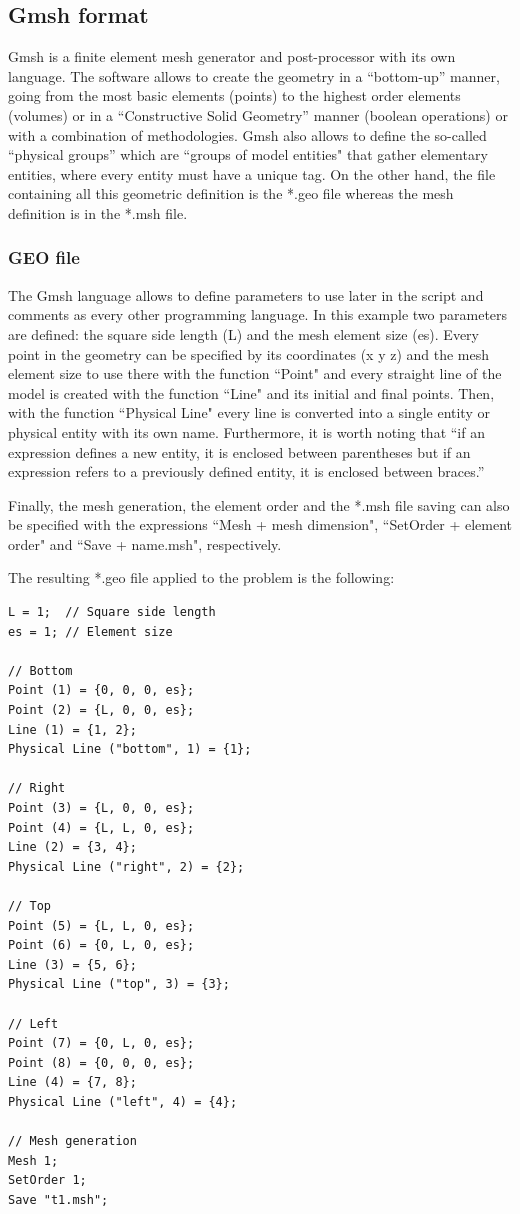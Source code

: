 \documentclass[A4]{article}
\begin{document}
\subsection{Gmsh format}

Gmsh \cite{gmsh, gmshweb} is a finite element mesh generator and post-processor with its own language. The software allows to create the geometry in a “bottom-up” manner, going from the most basic elements (points) to the highest order elements (volumes) or in a “Constructive Solid Geometry” manner (boolean operations) or with a combination of methodologies. Gmsh also allows to define  the so-called “physical groups” which are ``groups of model entities" that gather elementary entities, where every entity must have a unique tag. On the other hand, the file containing all this geometric definition is the *.geo file whereas the mesh definition is in the *.msh file. 

\subsubsection{GEO file}

The Gmsh language allows to define parameters to use later in the script and comments as every other programming language. In this example two parameters are defined: the square side length (L) and the mesh element size (es). Every point in the geometry can be specified by its coordinates (x y z) and the mesh element size to use there with the function ``Point" and every straight line of the model is created with the function ``Line" and its initial and final points. Then, with the function ``Physical Line" every line is converted into a single entity or physical entity with its own name. Furthermore, it is worth noting that “if an expression defines a new entity, it is enclosed between parentheses but if an expression refers to a previously defined entity, it is enclosed between braces.” \cite{gmshweb} 

Finally, the mesh generation, the element order and the *.msh file saving can also be specified with the expressions ``Mesh + mesh dimension", ``SetOrder + element order" and ``Save + name.msh", respectively.

The resulting *.geo file applied to the problem is the following:

\begin{Verbatim}
L = 1;  // Square side length
es = 1; // Element size

// Bottom
Point (1) = {0, 0, 0, es};
Point (2) = {L, 0, 0, es};
Line (1) = {1, 2};
Physical Line ("bottom", 1) = {1};

// Right
Point (3) = {L, 0, 0, es};
Point (4) = {L, L, 0, es};
Line (2) = {3, 4};
Physical Line ("right", 2) = {2};

// Top
Point (5) = {L, L, 0, es};
Point (6) = {0, L, 0, es};
Line (3) = {5, 6};
Physical Line ("top", 3) = {3};

// Left
Point (7) = {0, L, 0, es};
Point (8) = {0, 0, 0, es};
Line (4) = {7, 8};
Physical Line ("left", 4) = {4};

// Mesh generation
Mesh 1;
SetOrder 1;
Save "t1.msh";
\end{Verbatim}
\end{document}

